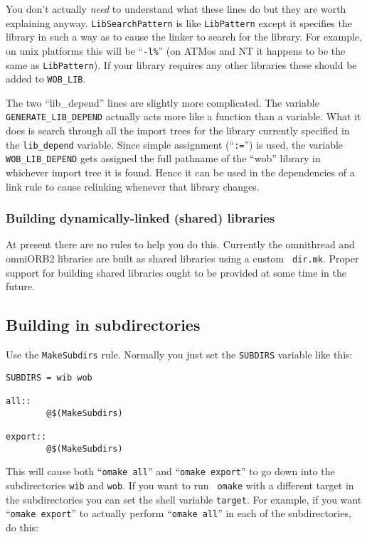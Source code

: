 \documentclass[11pt,twoside,onecolumn]{article}
\begin{document}
You don't actually {\em need} to understand what these lines do but they are
worth explaining anyway.  {\tt LibSearchPattern} is like {\tt LibPattern}
except it specifies the library in such a way as to cause the linker to search
for the library.  For example, on unix platforms this will be ``\verb|-l%|''
(on ATMos and NT it happens to be the same as {\tt LibPattern}).  If your
library requires any other libraries these should be added to \verb|WOB_LIB|.

The two ``lib\_depend'' lines are slightly more complicated.  The variable
\verb|GENERATE_LIB_DEPEND| actually acts more like a function than a
variable. What it does is search through all the import trees for the library
currently specified in the \verb|lib_depend| variable.  Since simple assignment
(``{\tt :=}'') is used, the variable \verb|WOB_LIB_DEPEND| gets assigned the
full pathname of the ``wob'' library in whichever import tree it is found.
Hence it can be used in the dependencies of a link rule to cause relinking
whenever that library changes.

\subsubsection{Building dynamically-linked (shared) libraries}

At present there are no rules to help you do this.  Currently the omnithread
and omniORB2 libraries are built as shared libraries using a custom {\tt
dir.mk}.  Proper support for building shared libraries ought to be provided at
some time in the future.


\subsection{Building in subdirectories}

Use the {\tt MakeSubdirs} rule.  Normally you just set the {\tt SUBDIRS}
variable like this:

{\footnotesize \begin{verbatim}
SUBDIRS = wib wob

all::
        @$(MakeSubdirs)

export::
        @$(MakeSubdirs)
\end{verbatim}}

This will cause both ``{\tt omake all}'' and ``{\tt omake export}'' to go down
into the subdirectories {\tt wib} and {\tt wob}.  If you want to run {\tt
omake} with a different target in the subdirectories you can set the shell
variable {\tt target}.  For example, if you want ``{\tt omake export}'' to
actually perform ``{\tt omake all}'' in each of the subdirectories, do this:
\end{document}
